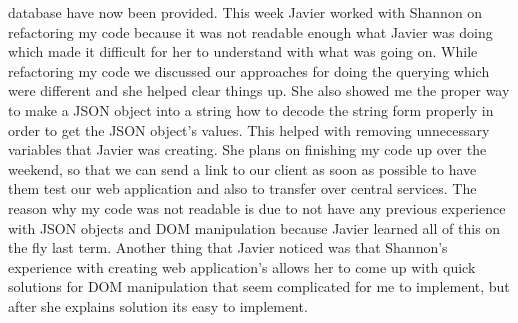 \documentclass[letterpaper,10pt,serif,draftclsnofoot,onecolumn,compsoc,titlepage]{IEEEtran}
\begin{document}
 database have now been provided.
 This week Javier worked with Shannon on refactoring my code because it was not readable enough what Javier was
 doing which made it difficult for her to understand with what was going on. While refactoring my code we
 discussed our approaches for doing the querying which were different and she helped clear things up.
 She also showed me the proper way to make a JSON object into a string how to decode the string form
 properly in order to get the JSON object's values. This helped with removing unnecessary variables that Javier
 was creating. She plans on finishing my code up over the weekend, so that we can send a link to our client
 as soon as possible to have them test our web application and also to transfer over central services. The reason
 why my code was not readable is due to not have any previous experience with JSON objects and DOM manipulation
 because Javier learned all of this on the fly last term. Another thing that Javier noticed was that Shannon's 
 experience with creating web application's allows her to come up with quick solutions for DOM manipulation that
 seem complicated for me to implement, but after she explains solution its easy to implement.
\end{document}

